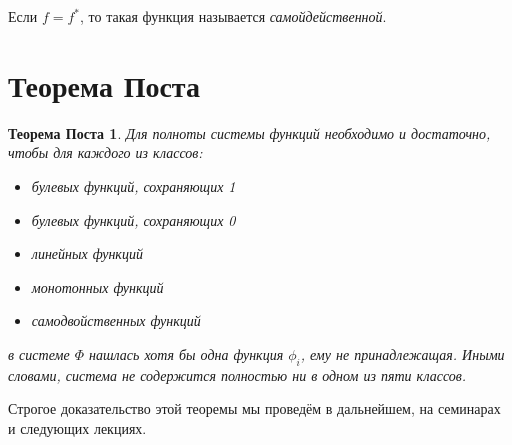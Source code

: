 \documentclass[a4paper, 12pt]{article}
\newtheorem*{poste}{Теорема Поста}
\begin{document}
Если $f = f^*$, то такая функция называется \textit{самойдейственной}.

\section*{Теорема Поста}
\begin{poste}
Для полноты системы функций необходимо и достаточно, чтобы для каждого из классов:
\begin{itemize}
    \item булевых функций, сохраняющих 1
    \item булевых функций, сохраняющих 0
    \item линейных функций
    \item монотонных функций
    \item самодвойственных функций
\end{itemize}
в системе $\Phi$ нашлась хотя бы одна функция $\phi_i$, ему не принадлежащая. Иными словами, система не содержится полностью ни в одном из пяти классов.
\end{poste}
Строгое доказательство этой теоремы мы проведём в дальнейшем, на семинарах и следующих лекциях.
\end{document}
